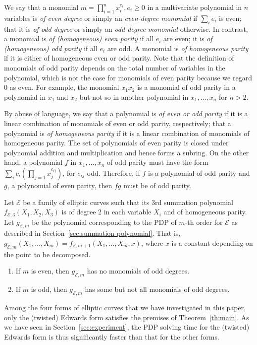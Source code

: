 We say that a monomial $m=\prod_{i=1}^n x_i^{e_i},e_i\geq 0$ in a
multivariate polynomial in $n$ variables is \emph{of even degree} or
simply an \emph{even-degree monomial} if $\sum_i e_i$ is even; that it
is \emph{of odd degree} or simply an \emph{odd-degree monomial}
otherwise.
%
In contrast, a monomial is \emph{of (homogeneous) even parity} if all
$e_i$ are even; it is \emph{of (homogeneous) odd parity} if all $e_i$
are odd.
%
A monomial is \emph{of homogeneous parity} if it is either of
homogeneous even or odd parity.
%
Note that the definition of monomials of odd parity depends on the
total number of variables in the polynomial, which is not the case for
monomials of even parity because we regard 0 as even.
%
For example, the monomial $x_1x_2$ is a monomial of odd parity in a
polynomial in $x_1$ and $x_2$ but not so in another polynomial in
$x_1,\ldots,x_n$ for $n>2$.

By abuse of language, we say that a polynomial is \emph{of even or odd
  parity} if it is a linear combination of monomials of even or odd
parity, respectively; that a polynomial is \emph{of homogeneous
  parity} if it is a linear combination of monomials of homogeneous
parity.
%
The set of polynomials of even parity is closed under polynomial
addition and multiplication and hence forms a subring.
%
On the other hand, a polynomial $f$ in $x_1,\ldots,x_n$ of odd parity
must have the form $\sum_i c_i\left(\prod_{j=1} x_j^{e_{ij}}\right)$,
for $e_{ij}$ odd.
%
Therefore, if $f$ is a polynomial of odd parity and $g$, a polynomial
of even parity, then $fg$ must be of odd parity.

\begin{theorem}
  \label{th:main}
  Let $\mathcal E$ be a family of elliptic curves such that its 3rd
  summation polynomial $f_{\mathcal E,3}(X_1,X_2,X_3)$ is of degree 2
  in each variable $X_i$ and of homogeneous parity.
  Let $g_{\mathcal E,m}$ be the polynomial corresponding to the PDP of
  $m$-th order for $\mathcal E$ as described in
  Section~\ref{sec:summation-polynomial}.
  That is,
  $g_{\mathcal E,m}(X_1,\ldots,X_m)=f_{\mathcal
    E,m+1}(X_1,\ldots,X_m,x)$, where $x$ is a constant depending on
  the point to be decomposed.
  \begin{enumerate}
  \item If $m$ is even, then $g_{\mathcal E,m}$ has no monomials of
    odd degrees.
  \item If $m$ is odd, then $g_{\mathcal E,m}$ has some but not all
    monomials of odd degrees.
  \end{enumerate}
\end{theorem}
%
Among the four forms of elliptic curves that we have investigated in
this paper, only the (twisted) Edwards form satisfies the premises of
Theorem~\ref{th:main}.
%
As we have seen in Section~\ref{sec:experiment}, the PDP solving time
for the (twisted) Edwards form is thus significantly faster than that
for the other forms.

